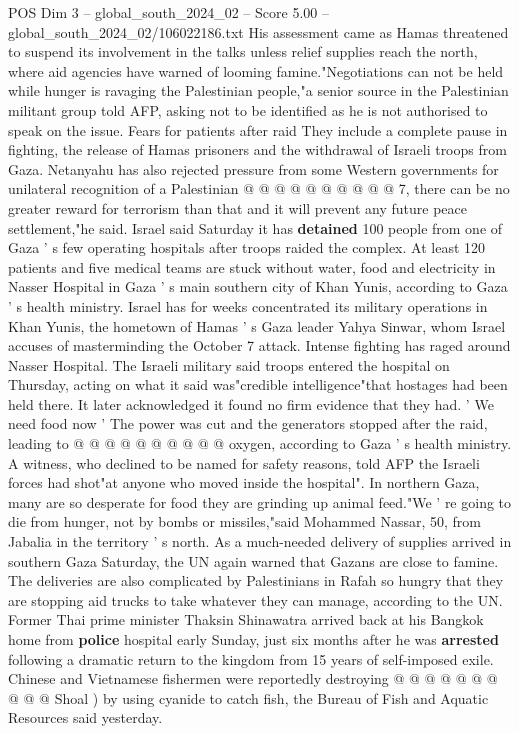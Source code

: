 \begin{textsample}{POS Dim 3 – global\_south\_2024\_02 – Score 5.00 – global\_south\_2024\_02/106022186.txt}
His assessment came as Hamas threatened to suspend its involvement in the talks unless relief supplies reach the north, where aid agencies have warned of looming famine."Negotiations can not be held while hunger is ravaging the Palestinian people,"a senior source in the Palestinian militant group told AFP, asking not to be identified as he is not authorised to speak on the issue.
Fears for patients after raid They include a complete pause in fighting, the release of Hamas prisoners and the withdrawal of Israeli troops from Gaza.
Netanyahu has also rejected pressure from some Western governments for unilateral recognition of a Palestinian @ @ @ @ @ @ @ @ @ @ 7, there can be no greater reward for terrorism than that and it will prevent any future peace settlement,"he said.
Israel said Saturday it has \textbf{detained} 100 people from one of Gaza ' s few operating hospitals after troops raided the complex.
At least 120 patients and five medical teams are stuck without water, food and electricity in Nasser Hospital in Gaza ' s main southern city of Khan Yunis, according to Gaza ' s health ministry.
Israel has for weeks concentrated its military operations in Khan Yunis, the hometown of Hamas ' s Gaza leader Yahya Sinwar, whom Israel accuses of masterminding the October 7 attack.
Intense fighting has raged around Nasser Hospital.
The Israeli military said troops entered the hospital on Thursday, acting on what it said was"credible intelligence"that hostages had been held there.
It later acknowledged it found no firm evidence that they had. ' We need food now ' The power was cut and the generators stopped after the raid, leading to @ @ @ @ @ @ @ @ @ @ oxygen, according to Gaza ' s health ministry.
A witness, who declined to be named for safety reasons, told AFP the Israeli forces had shot"at anyone who moved inside the hospital".
In northern Gaza, many are so desperate for food they are grinding up animal feed."We ' re going to die from hunger, not by bombs or missiles,"said Mohammed Nassar, 50, from Jabalia in the territory ' s north.
As a much-needed delivery of supplies arrived in southern Gaza Saturday, the UN again warned that Gazans are close to famine.
The deliveries are also complicated by Palestinians in Rafah so hungry that they are stopping aid trucks to take whatever they can manage, according to the UN.
Former Thai prime minister Thaksin Shinawatra arrived back at his Bangkok home from \textbf{police} hospital early Sunday, just six months after he was \textbf{arrested} following a dramatic return to the kingdom from 15 years of self-imposed exile.
Chinese and Vietnamese fishermen were reportedly destroying @ @ @ @ @ @ @ @ @ @ Shoal ) by using cyanide to catch fish, the Bureau of Fish and Aquatic Resources said yesterday.

\end{textsample}
